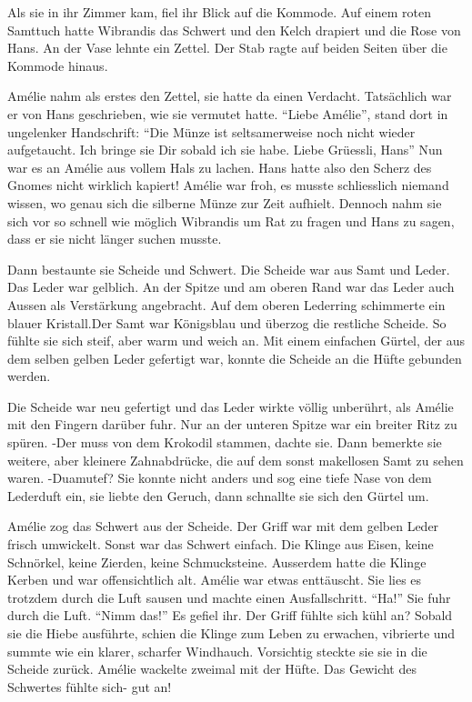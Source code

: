\documentclass[11pt,titlepage,a5paper]{book}
\begin{document}
Als sie in ihr Zimmer kam, fiel ihr Blick auf die Kommode. Auf einem roten Samttuch hatte Wibrandis das Schwert und den Kelch drapiert und die Rose von Hans. An der Vase lehnte ein Zettel. Der Stab ragte auf beiden Seiten über die Kommode hinaus.

Amélie nahm als erstes den Zettel, sie hatte da einen Verdacht. Tatsächlich war er von Hans geschrieben, wie sie vermutet hatte. "`Liebe Amélie"', stand dort in ungelenker Handschrift: "`Die Münze ist seltsamerweise noch nicht wieder aufgetaucht. Ich bringe sie Dir sobald ich sie habe. Liebe Grüessli, Hans"' Nun war es an Amélie aus vollem Hals zu lachen. Hans hatte also den Scherz des Gnomes nicht wirklich kapiert! Amélie war froh, es musste schliesslich niemand wissen, wo genau sich die silberne Münze zur Zeit aufhielt. Dennoch nahm sie sich vor so schnell wie möglich Wibrandis um Rat zu fragen und Hans zu sagen, dass er sie nicht länger suchen musste.

Dann bestaunte sie Scheide und Schwert. Die Scheide war aus Samt und Leder. Das Leder war gelblich. An der Spitze und am oberen Rand war das Leder auch Aussen als Verstärkung angebracht. Auf dem oberen Lederring schimmerte ein blauer Kristall.Der Samt war Königsblau und überzog die restliche Scheide. So fühlte sie sich steif, aber warm und weich an. Mit einem einfachen Gürtel, der aus dem selben gelben Leder gefertigt war, konnte die Scheide an die Hüfte gebunden werden. 

Die Scheide war neu gefertigt und das Leder wirkte völlig unberührt, als Amélie mit den Fingern darüber fuhr. Nur an der unteren Spitze war ein breiter Ritz zu spüren. -Der muss von dem Krokodil stammen, dachte sie. Dann bemerkte sie weitere, aber kleinere Zahnabdrücke, die auf dem sonst makellosen Samt zu sehen waren. -Duamutef? Sie konnte nicht anders und sog eine tiefe Nase von dem Lederduft ein, sie liebte den Geruch, dann schnallte sie sich den Gürtel um.

Amélie zog das Schwert aus der Scheide. Der Griff war mit dem gelben Leder frisch umwickelt. Sonst war das Schwert einfach. Die Klinge aus Eisen, keine Schnörkel, keine Zierden, keine Schmucksteine. Ausserdem hatte die Klinge Kerben und war offensichtlich alt. Amélie war etwas enttäuscht. Sie lies es trotzdem durch die Luft sausen und machte einen Ausfallschritt. "`Ha!"' Sie fuhr durch die Luft. "`Nimm das!"' Es gefiel ihr. Der Griff fühlte sich kühl an? Sobald sie die Hiebe ausführte, schien die Klinge zum Leben zu erwachen, vibrierte und summte wie ein klarer, scharfer Windhauch. Vorsichtig steckte sie sie in die Scheide zurück. Amélie wackelte zweimal mit der Hüfte. Das Gewicht des Schwertes fühlte sich- gut an!
\end{document}
